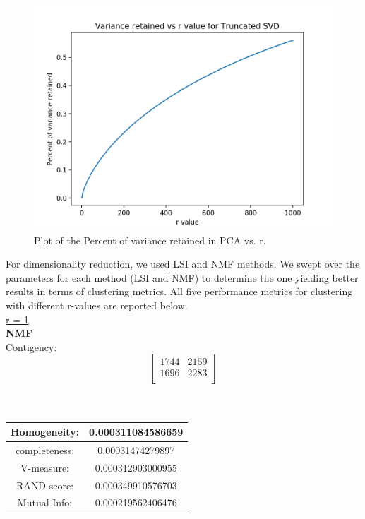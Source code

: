 \documentclass{report}
\begin{document}
\begin{figure}
  \centering
  \includegraphics[width=\linewidth]{p3_variance_r.png}
  \vspace*{-20mm}
  \caption{Plot of the Percent of variance retained in PCA vs. r.}
  \label{fig:variance_r}
\end{figure}

For dimensionality reduction, we used LSI and NMF methods. We swept over the parameters for each method (LSI and NMF) to determine the one yielding better results in terms of clustering metrics. All five performance metrics for clustering with different r-values are reported below. \\


\underline{r = 1} \\
\textbf{NMF} \\

Contigency: \[
\begin{bmatrix}
    1744       & 2159\\
    1696       & 2283\\
\end{bmatrix}
\]    
\\ \\

\begin{center}
\begin{tabu}{| c | c | }
\hline
Homogeneity: & 0.000311084586659 \\
\hline
completeness: & 0.00031474279897 \\
\hline
V-measure: & 0.000312903000955 \\
\hline
RAND score: & 0.000349910576703 \\
\hline
Mutual Info: & 0.000219562406476 \\
\hline
\end{tabu}
\end{center}
\end{document}
